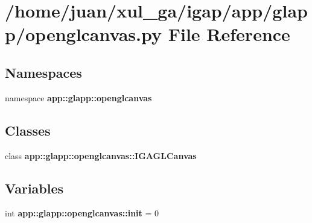 \section{/home/juan/xul\_\-ga/igap/app/glapp/openglcanvas.py File Reference}
\label{glapp_2openglcanvas_8py}
\subsection*{Namespaces}
\begin{CompactItemize}
\item 
namespace {\bf app::glapp::openglcanvas}
\end{CompactItemize}
\subsection*{Classes}
\begin{CompactItemize}
\item 
class {\bf app::glapp::openglcanvas::IGAGLCanvas}
\end{CompactItemize}
\subsection*{Variables}
\begin{CompactItemize}
\item 
int {\bf app::glapp::openglcanvas::init} = 0
\end{CompactItemize}

